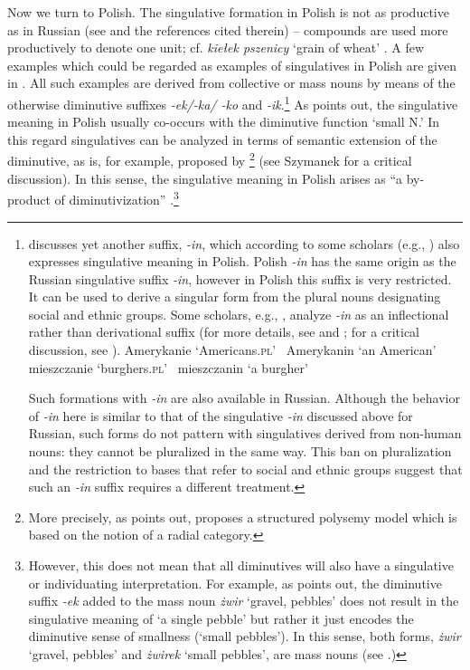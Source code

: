 \documentclass[output=paper,colorlinks,citecolor=brown]{langscibook}
\begin{document}
\largerpage
Now we turn to Polish. The singulative formation in Polish is not as productive as in Russian (see \citealt{Szymanek2014} and the references cited therein) -- compounds are used more productively to denote one unit; cf. \textit{kiełek pszenicy} `grain of wheat' \citep[863]{GunkelZifonun2017}. A few examples which could be regarded as examples of singulatives in Polish are given in . All such examples are derived from collective or mass nouns by means of the otherwise diminutive suffixes \textit{-ek/-ka/ -ko} and \textit{-ik}.\footnote{\citet{Szymanek2014} discusses yet another suffix, \textit{-in}, which according to some scholars (e.g., \citealt{Wierzbicka2002}) also expresses singulative meaning in Polish. Polish \textit{-in} has the same origin as the Russian singulative suffix \textit{-in}, however in Polish this suffix is very restricted. It can be used to derive a singular form from the plural nouns designating social and ethnic groups. Some scholars, e.g., \citet{GrzegorczykowaWrobel1999}, analyze \textit{-in} as an inflectional rather than derivational suffix (for more details, see \citealt{GrzegorczykowaWrobel1999} and \citealt{Orzechowska1999}; for a critical discussion, see \citealt{Szymanek2014}).
\ea 
\ea	Amerykanie `Americans.\textsc{pl}' \rightarrow \ Amerykanin `an American' 
\ex mieszczanie `burghers.\textsc{pl}' \rightarrow \ mieszczanin `a burgher' 
\z\z

\noindent Such formations with \textit{-in} are also available in Russian. Although the behavior of \textit{-in} here is similar to that of the singulative \textit{-in} discussed above for Russian, such forms do not pattern with singulatives derived from non-human nouns: they cannot be pluralized in the same way. This ban on pluralization and the restriction to bases that refer to social and ethnic groups suggest that such an \textit{-in} suffix requires a different treatment.} As \citet{Szymanek2014} points out, the singulative meaning in Polish usually co-occurs with the diminutive function `small N.' In this regard singulatives can be analyzed in terms of semantic extension of the diminutive, as is, for example, proposed by \citet{Jurafsky1996}\footnote{More precisely, as \citet{Szymanek2014} points out, \citet{Jurafsky1996} proposes a structured polysemy model which is based on the notion of a radial category.} (see Szymanek for a critical discussion). In this sense, the singulative meaning in Polish arises as ``a by-product of diminutivization'' \citep{Szymanek2014}.\footnote{However, this does not mean that all diminutives will also have a singulative or individuating interpretation. For example, as \citet{Szymanek2014} points out, the diminutive suffix \textit{-ek} added to the mass noun \textit{żwir} `gravel, pebbles' does not result in the singulative meaning of `a single pebble' but rather it just encodes the diminutive sense of smallness (`small pebbles'). In this sense, both forms, \textit{żwir} `gravel, pebbles' and \textit{żwirek} `small pebbles', are mass nouns (see \citealt{Szymanek2014}.)}
\end{document}
